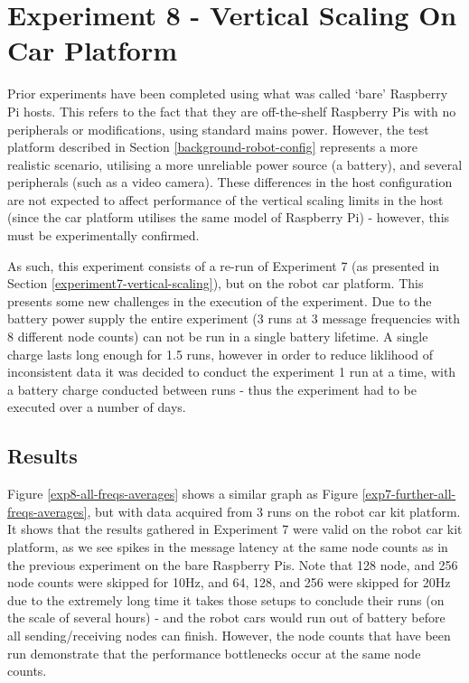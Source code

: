 \documentclass[../dissertation.tex]{subfiles}
\begin{document}
\section{Experiment 8 - Vertical Scaling On Car Platform}
\label{experiment8-vertical-scaling}

Prior experiments have been completed using what was called `bare' Raspberry Pi hosts. This refers to the fact that they are off-the-shelf Raspberry Pis with no peripherals or modifications, using standard mains power. However, the test platform described in Section \ref{background-robot-config} represents a more realistic scenario, utilising a more unreliable power source (a battery), and several peripherals (such as a video camera). These differences in the host configuration are not expected to affect performance of the vertical scaling limits in the host (since the car platform utilises the same model of Raspberry Pi) - however, this must be experimentally confirmed.

As such, this experiment consists of a re-run of Experiment 7 (as presented in Section \ref{experiment7-vertical-scaling}), but on the robot car platform. This presents some new challenges in the execution of the experiment. Due to the battery power supply the entire experiment (3 runs at 3 message frequencies with 8 different node counts) can not be run in a single battery lifetime. A single charge lasts long enough for 1.5 runs, however in order to reduce liklihood of inconsistent data it was decided to conduct the experiment 1 run at a time, with a battery charge conducted between runs - thus the experiment had to be executed over a number of days.

\subsection{Results}

Figure \ref{exp8-all-freqs-averages} shows a similar graph as Figure \ref{exp7-further-all-freqs-averages}, but with data acquired from 3 runs on the robot car kit platform. It shows that the results gathered in Experiment 7 were valid on the robot car kit platform, as we see spikes in the message latency at the same node counts as in the previous experiment on the bare Raspberry Pis. Note that 128 node, and 256 node counts were skipped for 10Hz, and 64, 128, and 256 were skipped for 20Hz due to the extremely long time it takes those setups to conclude their runs (on the scale of several hours) - and the robot cars would run out of battery before all sending/receiving nodes can finish. However, the node counts that have been run demonstrate that the performance bottlenecks occur at the same node counts.
\end{document}
